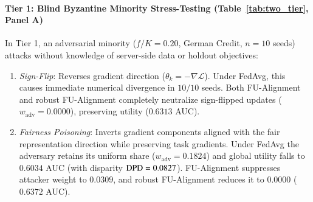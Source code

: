 

\paragraph{Tier 1: Blind Byzantine Minority Stress-Testing (Table~\ref{tab:two_tier}, Panel A)}
In Tier 1, an adversarial minority ($f/K = 0.20$, German Credit, $n=10$ seeds) attacks without knowledge of server-side data or holdout objectives:
\begin{enumerate}[leftmargin=*]
    \item \textit{Sign-Flip}: Reverses gradient direction ($\theta_k = -\nabla \mathcal{L}$). Under FedAvg, this causes immediate numerical divergence in $10/10$ seeds. Both FU-Alignment and robust FU-Alignment completely neutralize sign-flipped updates ($w_{\mathrm{adv}} = 0.0000$), preserving utility ($0.6313$ AUC).
    \item \textit{Fairness Poisoning}: Inverts gradient components aligned with the fair representation direction while preserving task gradients. Under FedAvg the adversary retains its uniform share ($w_{\mathrm{adv}} = 0.1824$) and global utility falls to $0.6034$ AUC (with disparity $\mathrm{DPD} = 0.0827$). FU-Alignment suppresses attacker weight to $0.0309$, and robust FU-Alignment reduces it to $0.0000$ ($0.6372$ AUC).
    

\end{enumerate}
